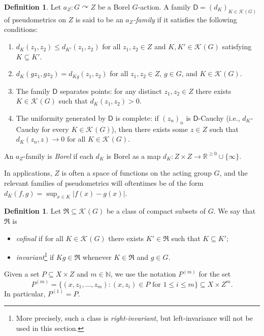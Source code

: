 \documentclass[12pt]{paper}
\numberwithin{equation}{section}
\theoremstyle{plain}
\theoremstyle{definition}
\newtheorem{definition}[theorem]{Definition}
\newcommand{\N}{\mathbb{N}}
\newcommand{\R}{\mathbb{R}}
\newcommand{\mfR}{\mathfrak{R}}
\newcommand{\vietoris}[2][]{\mathcal{K}_{#1}(#2)}
\newcommand{\unifm}{\mathsf{D}}
\newcommand{\acts}{\curvearrowright}
\begin{document}
\begin{definition}
  \label{def:U-family}
  Let \(a_{Z} : G \acts Z\) be a Borel \(G\)-action.  A family
  \(\unifm = (d_{K})_{K \in \vietoris{G}}\) of pseudometrics on \(Z\) is said to be an
  \emph{\(a_{Z}\)-family} if it satisfies the following conditions:
  \begin{enumerate}[leftmargin=1cm, label={\sf \arabic*}., ref={\sf \arabic*}]
  \item\label{item:unif-monotone} \(d_{K}(z_{1},z_{2}) \le d_{K'}(z_{1}, z_{2})\) for all
    \(z_{1}, z_{2} \in Z\) and \(K, K' \in \vietoris{G}\) satisfying \(K \subseteq K'\).
  \item\label{item:unif-shift} \(d_{K}(gz_{1}, gz_{2}) = d_{Kg}(z_{1},z_{2})\) for all
    \(z_{1},z_{2} \in Z\), \(g \in G\), and \(K \in \vietoris{G}\).
  \item\label{item:unif-hausdorff} The family \(\unifm\) separates points: for any distinct
    \(z_{1}, z_{2} \in Z\) there exists \(K \in \vietoris{G}\) such that
    \(d_{K}(z_{1}, z_{2}) > 0\).
  \item\label{item:unif-complete} The uniformity generated by \( \unifm \) is complete: if
    \((z_{n})_{n}\) is \(\unifm\)-Cauchy (i.e., \(d_{K}\)-Cauchy for every \(K \in \vietoris{G}\)),
    then there exists some \(z \in Z\) such that \(d_{K}(z_{n},z) \to 0\) for all
    \(K \in \vietoris{G}\).
  \end{enumerate}
  An \(a_{Z}\)-family is \emph{Borel} if each \(d_{K}\) is Borel as a map
  \(d_{K} : Z \times Z \to \R^{\ge 0} \cup \{\infty\}\).
\end{definition}

In applications, \(Z\) is often a space of functions on the acting group \(G\), and the relevant
families of pseudometrics will oftentimes be of the form \(d_K(f,g)=\sup_{x\in K}|f(x)-g(x)|\).

\begin{definition}
  \label{def:confinale-invariant-class}
  Let \(\mfR \subseteq \vietoris{G}\) be a class of compact subsets of \(G\).  We say that \(\mfR\)
  is
  \begin{itemize}
  \item \emph{cofinal} if for all \(K \in \vietoris{G}\) there exists \(K' \in \mfR\) such that
    \(K \subseteq K'\);
  \item \emph{invariant}\footnote{More precisely, such a class is \emph{right-invariant}, but
      left-invariance will not be used in this section.} if \(Kg \in \mfR\) whenever \(K \in \mfR\)
    and \(g \in G\).
  \end{itemize}
\end{definition}
Given a set \(P \subseteq X \times Z\) and \(m \in \N\), we use the notation \(P^{(m)}\) for
the set
\[P^{(m)} = \{(x,z_{1}, \ldots, z_{m}) : (x,z_{i}) \in P \textrm{ for } 1 \le i \le m\} \subseteq X
  \times Z^{m}.\] In particular, \(P^{(1)} = P\).
\end{document}
